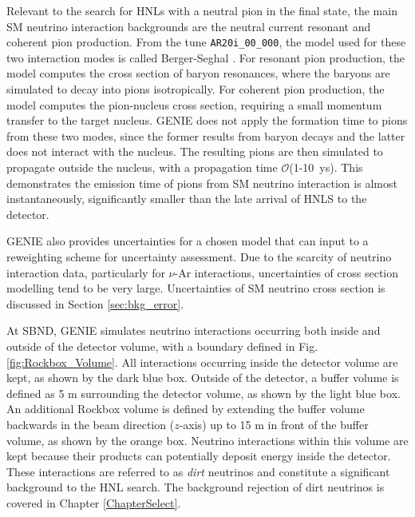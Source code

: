 Relevant to the search for HNLs with a neutral pion in the final state, the main SM neutrino interaction backgrounds are the neutral current resonant and coherent pion production.
From the tune \texttt{AR20i\_00\_000}, the model used for these two interaction modes is called Berger-Seghal \cite{genie_tune, piontune}.
For resonant pion production, the model computes the cross section of baryon resonances, where the baryons are simulated to decay into pions isotropically.
For coherent pion production, the model computes the pion-nucleus cross section, requiring a small momentum transfer to the target nucleus.
GENIE does not apply the formation time to pions from these two modes, since the former results from baryon decays and the latter does not interact with the nucleus.
The resulting pions are then simulated to propagate outside the nucleus, with a propagation time $\mathcal{O}$(1-10~ys).
This demonstrates the emission time of pions from SM neutrino interaction is almost instantaneously, significantly smaller than the late arrival of HNLS to the detector.

GENIE also provides uncertainties for a chosen model that can input to a reweighting scheme for uncertainty assessment.
Due to the scarcity of neutrino interaction data, particularly for $\nu$-Ar interactions, uncertainties of cross section modelling tend to be very large. 
Uncertainties of SM neutrino cross section is discussed in Section \ref{sec:bkg_error}.

At SBND, GENIE simulates neutrino interactions occurring both inside and outside of the detector volume, with a boundary defined in Fig. \ref{fig:Rockbox_Volume}.  
All interactions occurring inside the detector volume are kept, as shown by the dark blue box.
Outside of the detector, a buffer volume is defined as 5 m surrounding the detector volume, as shown by the light blue box.                       
An additional Rockbox volume is defined by extending the buffer volume backwards in the beam direction ($z$-axis) up to 15 m in front of the buffer volume, as shown by the orange box.
Neutrino interactions within this volume are kept because their products can potentially deposit energy inside the detector.
These interactions are referred to as \textit{dirt} neutrinos and constitute a significant background to the HNL search.
The background rejection of dirt neutrinos is covered in Chapter \ref{ChapterSelect}.

